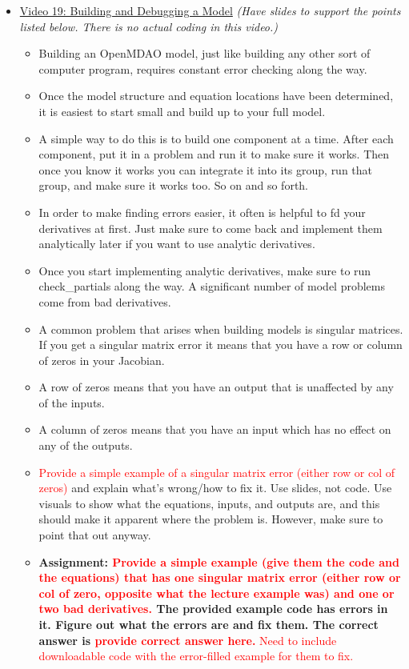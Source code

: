 \documentclass[12pt, letterpaper]{article}
\begin{document}
\begin{itemize}
	\item \underline{Video 19: Building and Debugging a Model} \textit{(Have slides to support the points listed below. There is no  actual coding in this video.)}
		\begin{itemize}
			\item Building an OpenMDAO model, just like building any other sort of computer program, requires constant error checking along the way.
			\item Once the model structure and equation locations have been determined, it is easiest to start small and build up to your full model.
			\item A simple way to do this is to build one component at a time. After each component, put it in a problem and run it to make sure it works. Then once you know it works you can integrate it into its group, run that group, and make sure it works too. So on and so forth.
			\item In order to make finding errors easier, it often is helpful to fd your derivatives at first. Just make sure to come back and implement them analytically later if you want to use analytic derivatives.
			\item Once you start implementing analytic derivatives, make sure to run check\_partials along the way. A significant number of model problems come from bad derivatives.
			\item A common problem that arises when building models is singular matrices. If you get a singular matrix error it means that you have a row or column of zeros in your Jacobian.
			\item A row of zeros means that you have an output that is unaffected by any of the inputs.
			\item A column of zeros means that you have an input which has no effect on any of the outputs.
			\item \textcolor{red}{Provide a simple example of a singular matrix error (either row or col of zeros)} and explain what’s wrong/how to fix it. Use slides, not code. Use visuals to show what the equations, inputs, and outputs are, and this should make it apparent where the problem is. However, make sure to point that out anyway.
			\item \textbf{Assignment: \textcolor{red}{Provide a simple example (give them the code and the equations) that has one singular matrix error (either row or col of zero, opposite what the lecture example was) and one or two bad derivatives.} The provided example code has errors in it. Figure out what the errors are and fix them. The correct answer is \textcolor{red}{provide correct answer here.}} \textcolor{red}{Need to include downloadable code with the error-filled example for them to fix.}
		\end{itemize}
		

\end{itemize}
\end{document}
